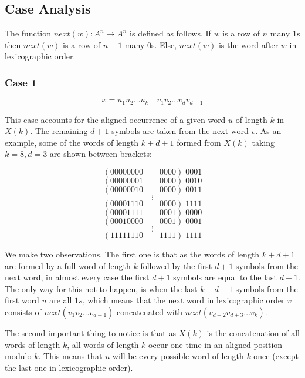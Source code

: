 \documentclass[11pt,a4paper]{tesis}
\newtheorem{definition}{Definition}[]
\newcommand{\note}[1]{\textbf{\color{red}{#1}}}
\begin{document}
\subsection{Case Analysis}


    The function  $next(w):A^n \rightarrow A^n $ is defined as follows. If $w$ is a row of $n$ many $1$s then  $next(w)$ is a row of $n+1$ many $0$s.
Else, $next(w)$ is the word  after $w$ in lexicographic order.

\subsubsection{Case 1}
$$x = u_1 u_2 \dots u_k \quad v_1 v_2 \dots v_{d} v_{d + 1}$$

This case accounts for the aligned occurrence of a given word $u$ of length $k$ in $X(k)$. The remaining $d + 1$ symbols are taken from the next word $v$.
As an example, some of the words of length $k + d + 1$ formed from $X(k)$ taking $k = 8, d = 3$ are shown between brackets:

$$( 00000000 \qquad 0000 ) \; 0001$$
$$( 00000001 \qquad 0000 ) \; 0010$$
$$( 00000010 \qquad 0000 ) \; 0011$$
$$\vdots$$
$$( 00001110 \qquad 0000 ) \; 1111$$
$$( 00001111 \qquad 0001 ) \; 0000$$
$$( 00010000 \qquad 0001 ) \; 0001$$
$$\vdots$$
$$( 11111110 \qquad 1111 ) \; 1111$$

We make two observations. The first one is that as the words of length $k + d + 1$ are formed by a full word of length $k$ followed by the first $d + 1$ symbols from the next word, in almost every case the first $d + 1$ symbols are equal to the last $d + 1$.
The only way for this not to happen, is when the last $k - d - 1$ symbols from the first word $u$ are all $1s$, which means that the next word in lexicographic order $v$ consists of $next(v_1 v_2 \dots v_{d + 1})$ concatenated with $next(v_{d + 2} v_{d + 3} \dots v_{k})$.

The second important thing to notice is that as $X(k)$ is the concatenation of all words of length $k$, 
all words of length $k$ occur one time in an aligned position modulo $k$. This means that $u$ will be every possible word of length $k$ once (except the last one in lexicographic order).
\end{document}
